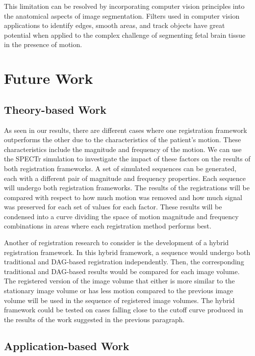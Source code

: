 This limitation can be resolved by incorporating computer vision principles into the anatomical aspects of image segmentation. Filters used in computer vision applications to identify edges, smooth areas, and track objects have great potential when applied to the complex challenge of segmenting fetal brain tissue in the presence of motion.

\section{Future Work}

\subsection{Theory-based Work}

As seen in our results, there are different cases where one registration framework outperforms the other due to the characteristics of the patient's motion. These characteristics include the magnitude and frequency of the motion. We can use the SPECTr simulation to investigate the impact of these factors on the results of both registration frameworks. A set of simulated sequences can be generated, each with a different pair of magnitude and frequency properties. Each sequence will undergo both registration frameworks. The results of the registrations will be compared with respect to how much motion was removed and how much signal was preserved for each set of values for each factor. These results will be condensed into a curve dividing the space of motion magnitude and frequency combinations in areas where each registration method performs best.

Another of registration research to consider is the development of a hybrid registration framework. In this hybrid framework, a sequence would undergo both traditional and DAG-based registration independently. Then, the corresponding traditional and DAG-based results would be compared for each image volume. The registered version of the image volume that either is more similar to the stationary image volume or has less motion compared to the previous image volume will be used in the sequence of registered image volumes. The hybrid framework could be tested on cases falling close to the cutoff curve produced in the results of the work suggested in the previous paragraph.

\subsection{Application-based Work}

